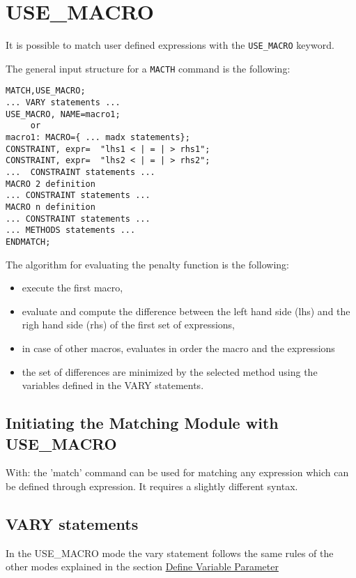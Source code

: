 %

\section{USE\_MACRO}
\label{sec:use_macro}
 
It is possible to match user defined expressions with the
\texttt{USE\_MACRO} keyword. 

The general input structure for a \texttt{MACTH} command is the following:

\begin{verbatim}
MATCH,USE_MACRO;
... VARY statements ...
USE_MACRO, NAME=macro1;
     or
macro1: MACRO={ ... madx statements};
CONSTRAINT, expr=  "lhs1 < | = | > rhs1";
CONSTRAINT, expr=  "lhs2 < | = | > rhs2";
...  CONSTRAINT statements ...
MACRO 2 definition
... CONSTRAINT statements ...
MACRO n definition
... CONSTRAINT statements ...
... METHODS statements ...
ENDMATCH;
\end{verbatim}
 
The algorithm for evaluating the penalty function is the following:
 
\begin{itemize}
   \item  execute the first macro,
   \item  evaluate and compute the difference between the left hand side
     (lhs) and the righ hand side (rhs) of the first set of expressions, 
   \item in case of other macros, evaluates in order the macro and the
     expressions 
   \item  the set of differences are  minimized by the selected method
     using the variables defined in the VARY statements. 
\end{itemize}

\subsection{Initiating the Matching Module with USE\_MACRO}
 
With:
the 'match' command can be used for matching any expression which can be
defined through expression. It requires a slightly different syntax.

\subsection{VARY statements}
In the USE\_MACRO mode the vary statement follows the same rules of the
other modes explained in the section \href{match_vary.html}{Define
  Variable Parameter} 

